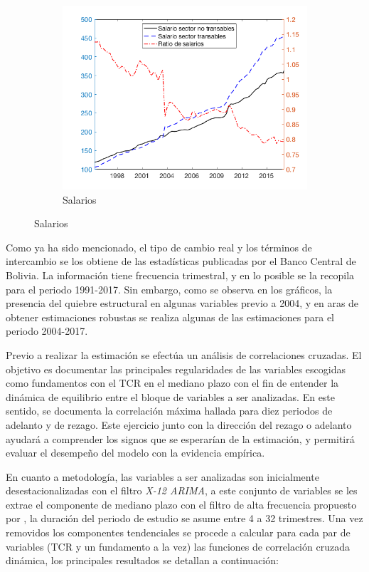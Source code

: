 \documentclass[12pt,letterpaper]{article}
\begin{document}
\begin{figure}
\begin{subfigure}[b]{0.4\textwidth}
        \includegraphics[width=\textwidth]{fig13}
        \caption{Salarios}
    \end{subfigure}
\end{figure}

Como ya ha sido mencionado, el tipo de cambio real y los términos de intercambio se los obtiene de las estadísticas publicadas por el Banco Central de Bolivia. La información tiene frecuencia trimestral, y en lo posible se la recopila para el periodo 1991-2017. Sin embargo, como se observa en los gráficos, la presencia del quiebre estructural en algunas variables previo a 2004, y en aras de obtener estimaciones robustas se realiza algunas de las estimaciones para el periodo 2004-2017.

Previo a realizar la estimación se efectúa un análisis de correlaciones cruzadas. El objetivo es documentar las principales regularidades de las variables escogidas como fundamentos con el TCR en el mediano plazo con el fin de entender la dinámica de equilibrio entre el bloque de variables a ser analizadas. En este sentido, se documenta la correlación máxima hallada para diez periodos de adelanto y de rezago. Este ejercicio junto con la dirección del rezago o adelanto ayudará a comprender los signos que se esperarían de la estimación, y permitirá evaluar el desempeño del modelo con la evidencia empírica.

En cuanto a metodología, las variables a ser analizadas son inicialmente desestacionalizadas con el filtro \emph{X-12 ARIMA}, a este conjunto de variables se les extrae el componente de mediano plazo con el filtro de alta frecuencia propuesto por \cite{christiano2003band}, la duración del periodo de estudio se asume entre 4 a 32 trimestres. Una vez removidos los componentes tendenciales se procede a calcular para cada par de variables (TCR y un fundamento a la vez) las funciones de correlación cruzada dinámica, los principales resultados se detallan a continuación:
\end{document}
